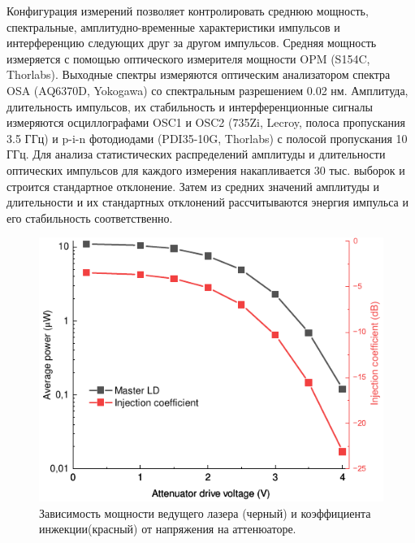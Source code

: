 Конфигурация измерений позволяет контролировать среднюю мощность, спектральные, амплитудно-временные характеристики импульсов и интерференцию следующих друг за другом импульсов. Средняя мощность измеряется с помощью оптического измерителя мощности OPM (S154C, Thorlabs). Выходные спектры измеряются оптическим анализатором спектра OSA (AQ6370D, Yokogawa) со спектральным разрешением 0.02 нм. Амплитуда, длительность импульсов, их стабильность и интерференционные сигналы измеряются осциллографами OSC1 и OSC2 (735Zi, Lecroy, полоса пропускания 3.5 ГГц) и p-i-n фотодиодами (PDI35-10G, Thorlabs) с полосой пропускания 10 ГГц. Для анализа статистических распределений амплитуды и длительности оптических импульсов для каждого измерения накапливается 30 тыс. выборок и строится стандартное отклонение. Затем из средних значений амплитуды и длительности и их стандартных отклонений рассчитываются энергия импульса и его стабильность соответственно.
\begin{figure}
	\centering
	\includegraphics[width=\linewidth]{images/master_power.pdf}
	\caption{Зависимость мощности ведущего лазера (черный) и коэффициента инжекции(красный) от напряжения на аттенюаторе.}
	\label{fig:master_power}
\end{figure}

